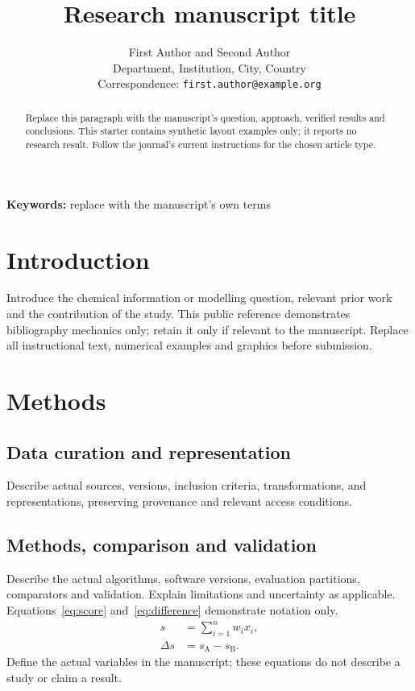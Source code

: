 \documentclass[letterpaper,11pt]{article}
\title{Research manuscript title}
\author{First Author and Second Author\\
  \small Department, Institution, City, Country\\
  \small Correspondence: \texttt{first.author@example.org}}
\date{}
\begin{document}
\maketitle
\begin{abstract}
Replace this paragraph with the manuscript's question, approach, verified
results and conclusions. This starter contains synthetic layout examples
only; it reports no research result. Follow the journal's current instructions
for the chosen article type.
\end{abstract}

\noindent\textbf{Keywords:} replace with the manuscript's own terms

\section{Introduction}\label{sec:introduction}
Introduce the chemical information or modelling question, relevant prior
work and the contribution of the study. This public reference demonstrates bibliography mechanics only;
retain it only if relevant to the manuscript\cite{wilkinson2016fair}. Replace
all instructional text, numerical examples and graphics before submission.

\section{Methods}\label{sec:methods}
\subsection{Data curation and representation}
Describe actual sources, versions, inclusion criteria, transformations, and
representations, preserving provenance and relevant access conditions.
\subsection{Methods, comparison and validation}
Describe the actual algorithms, software versions, evaluation partitions,
comparators and validation. Explain limitations and uncertainty as applicable.
Equations~\eqref{eq:score} and~\eqref{eq:difference} demonstrate notation only.
\begin{align}
 s &= \sum_{i=1}^{n} w_i x_i,\label{eq:score}\\
 \Delta s &= s_{\mathrm{A}}-s_{\mathrm{B}}.\label{eq:difference}
\end{align}
Define the actual variables in the manuscript; these equations do not describe
a study or claim a result.
\end{document}
